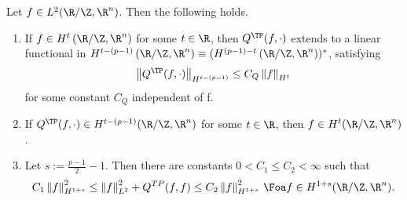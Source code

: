 \begin{lemma}[$ Q^{\TP} $ elliptic]\label{lem:EllipticRegularityQTP}
    Let $ f\in L^2(\R/\Z,\R^n) $. Then the following holds. 
    \begin{enumerate}
        \item If $ f\in H^{t}\left( \R/\Z,\R^n \right) $ for some $ t\in \R $, then $ Q^{\TP}(f,\cdot) $ extends to a linear functional in $ H^{t-(p-1)}\left( \R/\Z,\R^n \right)\equiv(H^{(p-1)-t}\left( \R/\Z,\R^n \right)  )^* $, satisfying 
        \begin{equation}\label{eq:46eq1}
            \left\|Q^{\TP}(f,\cdot) \right\|_{H^{t-(p-1)}}\le C_{Q}\left\|f \right\|_{H^t}
        \end{equation}
        for some constant $ C_Q $ independent of f. 
        \item If $ Q^{\TP}(f,\cdot) \in H^{t-(p-1)}(\R/\Z,\R^n)$ for some $ t\in \R $, then $ f\in H^{t}(\R/\Z,\R^n) $. 
        \item Let $ s:=\frac{p-1}{2}-1 $. Then there are constants $ 0<C_1\le C_2<\infty $ such that 
        \begin{equation}\label{eq:46eq2}
            C_1\left\|f \right\|^2_{H^{1+s}}\le \left\|f \right\|_{L^2}^2+Q^{TP}(f,f)\le C_2\left\|f \right\|_{H^{1+s}}^2\,\Foa f\in H^{1+s}(\R/\Z,\R^n).
        \end{equation}
    \end{enumerate}
\end{lemma}

